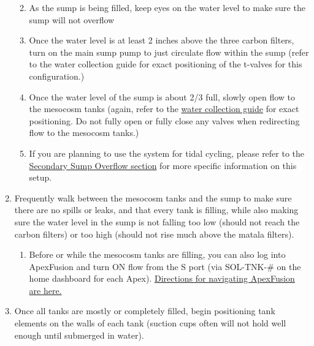 \documentclass[
]{book}
\providecommand{\tightlist}{%
  \setlength{\itemsep}{0pt}\setlength{\parskip}{0pt}}
\begin{document}
\begin{enumerate}
  \begin{enumerate}
  \def\labelenumii{\arabic{enumii}.}
  \tightlist
  \item
    As the sump is being filled, keep eyes on the water level to make sure the sump will not overflow
  \item
    Once the water level is at least 2 inches above the three carbon filters, turn on the main sump pump to just circulate flow within the sump (refer to the water collection guide for exact positioning of the t-valves for this configuration.)
  \item
    Once the water level of the sump is about 2/3 full, slowly open flow to the mesocosm tanks (again, refer to the \href{06-water_collection.rmd}{water collection guide} for exact positioning. Do not fully open or fully close any valves when redirecting flow to the mesocosm tanks.)
  \item
    If you are planning to use the system for tidal cycling, please refer to the \protect\hyperlink{Overflow_into_Secondary_Sump}{Secondary Sump Overflow section} for more specific information on this setup.
  \end{enumerate}
\item
  Frequently walk between the mesocosm tanks and the sump to make sure there are no spills or leaks, and that every tank is filling, while also making sure the water level in the sump is not falling too low (should not reach the carbon filters) or too high (should not rise much above the matala filters).

  \begin{enumerate}
  \def\labelenumii{\arabic{enumii}.}
  \tightlist
  \item
    Before or while the mesocosm tanks are filling, you can also log into ApexFusion and turn ON flow from the S port (via SOL-TNK-\# on the home dashboard for each Apex). \href{12-apex_fusion_guide.rmd}{Directions for navigating ApexFusion are here.}
  \end{enumerate}
\item
  Once all tanks are mostly or completely filled, begin positioning tank elements on the walls of each tank (suction cups often will not hold well enough until submerged in water).


\end{enumerate}
\end{document}
